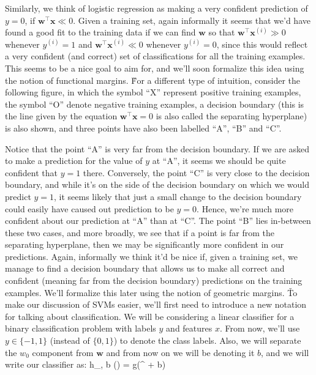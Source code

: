 Similarly, we think of logistic regression as making a very confident prediction of $y = 0$, if
$\boldsymbol{w}^{\intercal} \boldsymbol{x} \ll 0$. Given a training set, again informally it seems that we'd have
found a good fit to the training data if we can find $\boldsymbol{w}$ so that $\boldsymbol{w}^{\intercal}
\boldsymbol{x}^{(i)} \gg 0$ whenever $y^(i) = 1$ and $\boldsymbol{w}^{\intercal} \boldsymbol{x}^{(i)} \ll 0$ whenever
$y^(i) = 0$, since this would reflect a very confident (and correct) set of classifications for all the training
examples. This seems to be a nice goal to aim for, and we'll soon formalize this idea using the notion of functional
margins. \v

For a different type of intuition, consider the following figure, in which the symbol ``X'' represent positive
training examples, the symbol ``O'' denote negative training examples, a decision boundary (this is the line given by
the equation $\boldsymbol{w}^{\intercal} \boldsymbol{x} = 0$ is also called the separating hyperplane) is also shown,
and three points have also been labelled ``A'', ``B'' and ``C''.


Notice that the point ``A'' is very far from the decision boundary. If we are asked to make a prediction for the value
of $y$ at ``A'', it seems we should be quite confident that $y = 1$ there. Conversely, the point ``C'' is very close to
the decision boundary, and while it's on the side of the decision boundary on which we would predict $y = 1$, it
seems likely that just a small change to the decision boundary could easily have caused out prediction to be $y = 0$.
Hence, we're much more confident about our prediction at ``A'' than at ``C''. The point ``B'' lies in-between these two
cases, and more broadly, we see that if a point is far from the separating hyperplane, then we may be significantly
more confident in our predictions. Again, informally we think it'd be nice if, given a training set, we manage to
find a decision boundary that allows us to make all correct and confident (meaning far from the decision boundary)
predictions on the training examples. We'll formalize this later using the notion of geometric margins. \v

To make our discussion of SVMs easier, we'll first need to introduce a new notation for talking about classification.
We will be considering a linear classifier for a binary classification problem with labels $y$ and features $x$. From
now, we'll use $y \in \{ -1, 1 \}$ (instead of $ \{ 0, 1 \} $) to denote the class labels. Also, we will separate the
$w_0$ component from $\boldsymbol{w}$ and from now on we will be denoting it $b$, and we will write our classifier as:
\bse
h_{, b} () = g(^{\intercal}  + b)
\ese

